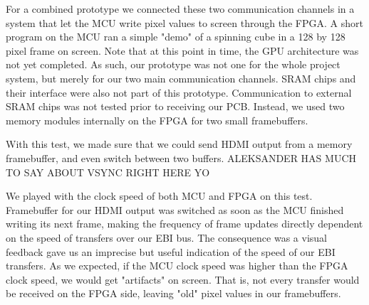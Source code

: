 For a combined prototype we connected these two communication channels in a system that let the MCU write pixel values to screen through the FPGA.
A short program on the MCU ran a simple "demo" of a spinning cube in a 128 by 128 pixel frame on screen.
Note that at this point in time, the GPU architecture was not yet completed.
As such, our prototype was not one for the whole project system, but merely for our two main communication channels.
SRAM chips and their interface were also not part of this prototype.
Communication to external SRAM chips was not tested prior to receiving our PCB.
Instead, we used two memory modules internally on the FPGA for two small framebuffers.

With this test, we made sure that we could send HDMI output from a memory framebuffer, and even switch between two buffers. 
ALEKSANDER HAS MUCH TO SAY ABOUT VSYNC RIGHT HERE YO

We played with the clock speed of both MCU and FPGA on this test.
Framebuffer for our HDMI output was switched as soon as the MCU finished writing its next frame, making the frequency of frame updates directly dependent on the speed of transfers over our EBI bus.
The consequence was a visual feedback gave us an imprecise but useful indication of the speed of our EBI transfers.
As we expected, if the MCU clock speed was higher than the FPGA clock speed, we would get "artifacts" on screen.
That is, not every transfer would be received on the FPGA side, leaving "old" pixel values in our framebuffers.